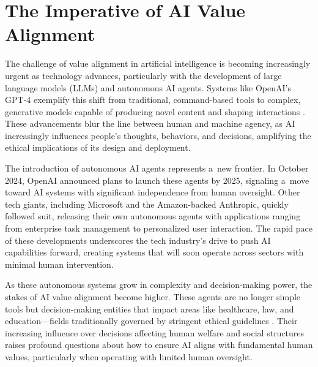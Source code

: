 \documentclass[%
  manuscript=article,
  year=2024,
  volume=77,
  doi=00000.000,
]{zfn}
\begin{document}
\section{The Imperative of AI Value Alignment}

The challenge of value alignment in artificial intelligence is becoming increasingly urgent as technology advances, particularly with the development of large language models (LLMs) and autonomous AI agents. Systems like OpenAI's GPT-4 exemplify this shift from traditional, command-based tools to complex, generative models capable of producing novel content and shaping interactions 
\parencite[][]{openai_gpt4_2024}. %
 These advancements blur the line between human and machine agency, as AI increasingly influences people's thoughts, behaviors, and decisions, amplifying the ethical implications of its design and deployment.



The introduction of autonomous AI agents represents a~new frontier. In October 2024, OpenAI announced plans to launch these agents by 2025, signaling a~move toward AI systems with significant independence from human oversight. Other tech giants, including Microsoft and the Amazon-backed Anthropic, quickly followed suit, releasing their own autonomous agents with applications ranging from enterprise task management to personalized user interaction. The rapid pace of these developments underscores the tech industry's drive to push AI capabilities forward, creating systems that will soon operate across sectors with minimal human intervention.



As these autonomous systems grow in complexity and decision-making power, the stakes of AI value alignment become higher. These agents are no longer simple tools but decision-making entities that impact areas like healthcare, law, and education---fields traditionally governed by stringent ethical guidelines 
\parencite[][]{coeckelbergh_ai_2020}. %
 Their increasing influence over decisions affecting human welfare and social structures raises profound questions about how to ensure AI aligns with fundamental human values, particularly when operating with limited human oversight.
\end{document}
